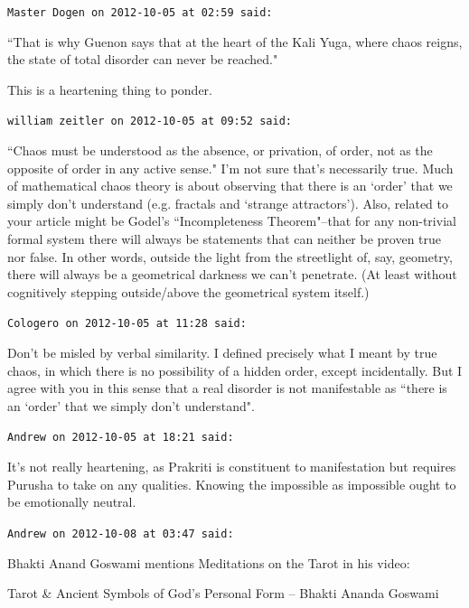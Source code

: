\begin{footnotesize}\begin{sffamily}



\texttt{Master Dogen on 2012-10-05 at 02:59 said: }

``That is why Guenon says that at the heart of the Kali Yuga, where chaos reigns, the state of total disorder can never
be reached."

This is a heartening thing to ponder.


\hfill

\texttt{william zeitler on 2012-10-05 at 09:52 said: }

``Chaos must be understood as the absence, or privation, of order, not as the opposite of order in any active sense."
I'm not sure that's necessarily true. Much of mathematical chaos theory is
about observing that there is an `order' that we simply
don't understand (e.g. fractals and `strange
attractors'). Also, related to your article might be Godel's ``Incompleteness
Theorem"–that for any non-trivial formal system there will always be statements that can neither be proven true nor
false. In other words, outside the light from the streetlight of, say, geometry, there will always be a geometrical
darkness we can't penetrate. (At least without cognitively stepping outside/above the geometrical
system itself.)


\hfill

\texttt{Cologero on 2012-10-05 at 11:28 said: }

Don't be misled by verbal similarity. I defined precisely what I meant by true chaos, in which
there is no possibility of a hidden order, except incidentally. But I agree with you in this sense that a real disorder
is not manifestable as ``there is an `order' that we simply
don't understand".


\hfill

\texttt{Andrew on 2012-10-05 at 18:21 said: }

It's not really heartening, as Prakriti is constituent to manifestation but requires Purusha to
take on any qualities. Knowing the impossible as impossible ought to be emotionally neutral.


\hfill

\texttt{Andrew on 2012-10-08 at 03:47 said: }

Bhakti Anand Goswami mentions Meditations on the Tarot in his video:

Tarot \& Ancient Symbols of God's Personal Form – Bhakti Ananda Goswami


\end{sffamily}
\end{footnotesize}
